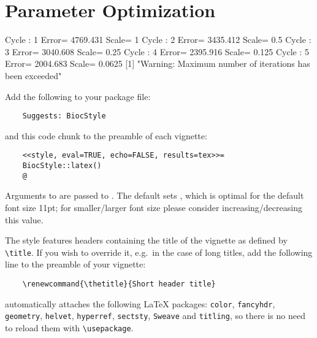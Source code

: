 \documentclass{article}
\begin{document}
\section{Parameter Optimization}

\begin{Schunk}
\begin{Soutput}
Cycle : 1 	Error=  4769.431 	Scale=  1 
Cycle : 2 	Error=  3435.412 	Scale=  0.5 
Cycle : 3 	Error=  3040.608 	Scale=  0.25 
Cycle : 4 	Error=  2395.916 	Scale=  0.125 
Cycle : 5 	Error=  2004.683 	Scale=  0.0625 
[1] "Warning: Maximum number of iterations has been exceeded"
\end{Soutput}
\end{Schunk}


Add the following to your package  file:
\begin{verbatim}
    Suggests: BiocStyle
\end{verbatim}
and this code chunk to the preamble of each vignette:
\begin{verbatim}
    <<style, eval=TRUE, echo=FALSE, results=tex>>=
    BiocStyle::latex()
    @ 
\end{verbatim}
Arguments to  are passed to . The default sets , which is optimal for the default font size 11pt; for smaller/larger font size please consider increasing/decreasing this value.

The style features headers containing the title of the vignette as defined by \verb+\title+. If you wish to override it, e.g.~in the case of long titles, add the following line to the preamble of your vignette:
\begin{verbatim}
    \renewcommand{\thetitle}{Short header title}
\end{verbatim}

 automatically attaches the following \LaTeX{} packages: \texttt{color}, \texttt{fancyhdr}, \texttt{geometry}, \texttt{helvet}, \texttt{hyperref}, \texttt{sectsty}, \texttt{Sweave} and \texttt{titling}, so there is no need to reload them with \verb+\usepackage+.
\end{document}
